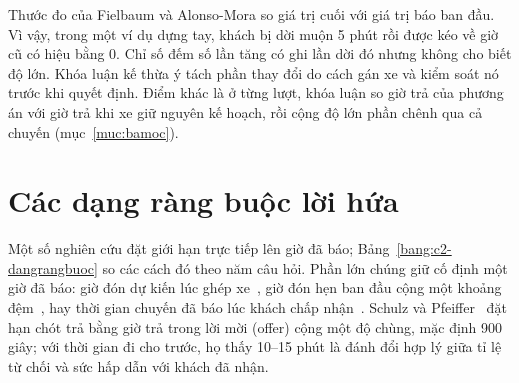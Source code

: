 Thước đo của Fielbaum và Alonso-Mora so giá trị cuối với giá trị báo ban đầu. Vì vậy, trong một ví dụ dựng tay, khách
bị dời muộn 5 phút rồi được kéo về giờ cũ có hiệu bằng 0. Chỉ số đếm số lần tăng có ghi lần dời đó nhưng không cho biết
độ lớn. Khóa luận kế thừa ý tách phần thay đổi do cách gán xe và kiểm soát nó trước khi quyết định. Điểm khác là ở từng
lượt, khóa luận so giờ trả của phương án với giờ trả khi xe giữ nguyên kế hoạch, rồi cộng độ lớn phần chênh qua cả
chuyến (mục~\ref{muc:bamoc}).

\section{Các dạng ràng buộc lời hứa}
\label{muc:c2-rangbuoc}

Một số nghiên cứu đặt giới hạn trực tiếp lên giờ đã báo; Bảng~\ref{bang:c2-dangrangbuoc} so các cách đó theo năm câu
hỏi. Phần lớn chúng giữ cố định một giờ đã báo: giờ đón
dự kiến lúc ghép xe~\cite{alonsomora2017}, giờ đón hẹn ban đầu cộng một khoảng đệm~\cite{lu2024}, hay thời gian
chuyến đã báo lúc khách chấp nhận~\cite{laupichler2026}. Schulz và Pfeiffer~\cite{schulz2026} đặt hạn chót trả bằng
giờ trả trong lời mời (offer) cộng một độ chùng, mặc định 900 giây; với thời gian đi cho trước, họ thấy 10--15 phút là
đánh đổi hợp lý giữa tỉ lệ từ chối và sức hấp dẫn với khách đã nhận.

